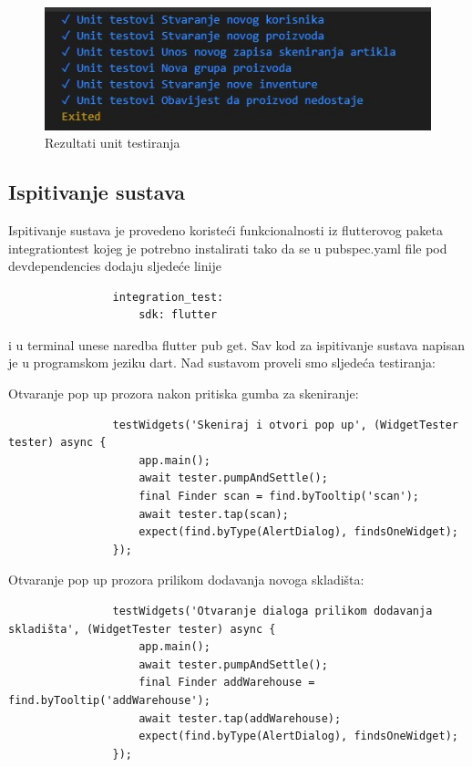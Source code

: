 			\begin{figure}[H]
				\centering
				\includegraphics[width=0.8\linewidth]{"slike/Test3"}
				\caption{Rezultati unit testiranja}
				\label{Slika 5.3}
			\end{figure}
			
			
			
			\subsection{Ispitivanje sustava}
			
			 Ispitivanje sustava je provedeno koristeći funkcionalnosti iz flutterovog paketa integration\textunderscore test kojeg je potrebno instalirati tako da se u pubspec.yaml file pod dev\textunderscore dependencies dodaju sljedeće linije\\
			
			 \begin{verbatim}
			 	integration_test:
			 		sdk: flutter
			 \end{verbatim}
		 	i u terminal unese naredba flutter pub get. Sav kod za ispitivanje sustava napisan je u programskom jeziku dart. Nad sustavom proveli smo sljedeća testiranja:
		 	
		 	Otvaranje pop up prozora nakon pritiska gumba za skeniranje:
		 	\begin{verbatim}
		 		testWidgets('Skeniraj i otvori pop up', (WidgetTester tester) async {
		 			app.main();
		 			await tester.pumpAndSettle();
		 			final Finder scan = find.byTooltip('scan');
		 			await tester.tap(scan);
		 			expect(find.byType(AlertDialog), findsOneWidget);
		 		});
		 	\end{verbatim}
	 		
	 		Otvaranje pop up prozora prilikom dodavanja novoga skladišta:
	 		\begin{verbatim}
	 			testWidgets('Otvaranje dialoga prilikom dodavanja skladišta', (WidgetTester tester) async {
	 				app.main();
	 				await tester.pumpAndSettle();
	 				final Finder addWarehouse = find.byTooltip('addWarehouse');
	 				await tester.tap(addWarehouse);
	 				expect(find.byType(AlertDialog), findsOneWidget);
	 			});
	 		\end{verbatim}
 			
